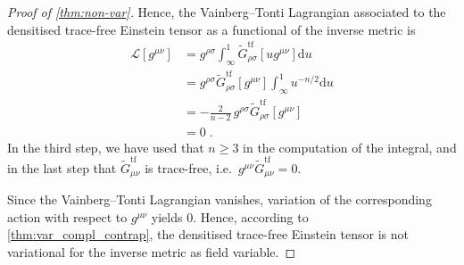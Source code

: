 \documentclass[10pt,a4paper]{amsart}
\newcommand*{\D}{\mathrm{d}} %
\begin{document}
\begin{proof}[Proof of \cref{thm:non-var}]
  Hence, the Vainberg--Tonti Lagrangian associated to the densitised
  trace-free Einstein tensor as a functional of the inverse metric is
  \begin{align}
    \mathcal L[g^{\mu\nu}]
    &= g^{\rho\sigma} \int_\infty^1
      \tilde{G}^\mathrm{tf}_{\rho\sigma}[u g^{\mu\nu}] \D u \nonumber\\
    &= g^{\rho\sigma} \tilde{G}^\mathrm{tf}_{\rho\sigma}[g^{\mu\nu}]
      \int_\infty^1 u^{-n/2} \D u \nonumber\\
    &= -\frac{2}{n-2} \,
      g^{\rho\sigma} \tilde{G}^\mathrm{tf}_{\rho\sigma}[g^{\mu\nu}]
      \nonumber\\
    &= 0 \; .
  \end{align}
  In the third step, we have used that $n \ge 3$ in the computation of
  the integral, and in the last step that
  $\tilde{G}^\mathrm{tf}_{\mu\nu}$ is trace-free, i.e.\ $g^{\mu\nu}
  \tilde{G}^\mathrm{tf}_{\mu\nu} = 0$.

  Since the Vainberg--Tonti Lagrangian vanishes, variation of the
  corresponding action with respect to $g^{\mu\nu}$ yields $0$.
  Hence, according to \cref{thm:var_compl_contrap}, the densitised
  trace-free Einstein tensor is not variational for the inverse metric
  as field variable.
\end{proof}
\end{document}
